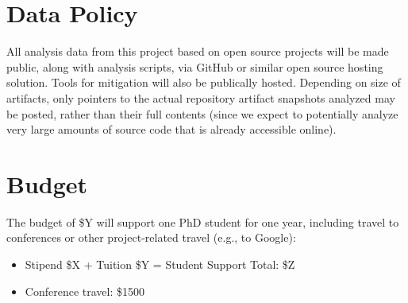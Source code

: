 \documentclass[10pt]{article}
\begin{document}
\section{Data Policy}

All analysis data from this project based on open source projects will be made public, along with analysis scripts, via GitHub or similar open source hosting solution.  Tools for mitigation will also be publically hosted.  Depending on size of artifacts, only pointers to the actual repository artifact snapshots analyzed may be posted, rather than their full contents (since we expect to potentially analyze very large amounts of source code that is already accessible online).

\section{Budget}

The budget of \$Y will support one PhD student for one year, including travel to conferences or other project-related travel (e.g., to Google):

\begin{itemize}
\item Stipend \$X + Tuition \$Y = Student Support Total: \$Z
\item Conference travel: \$1500
\end{itemize}
\end{document}
